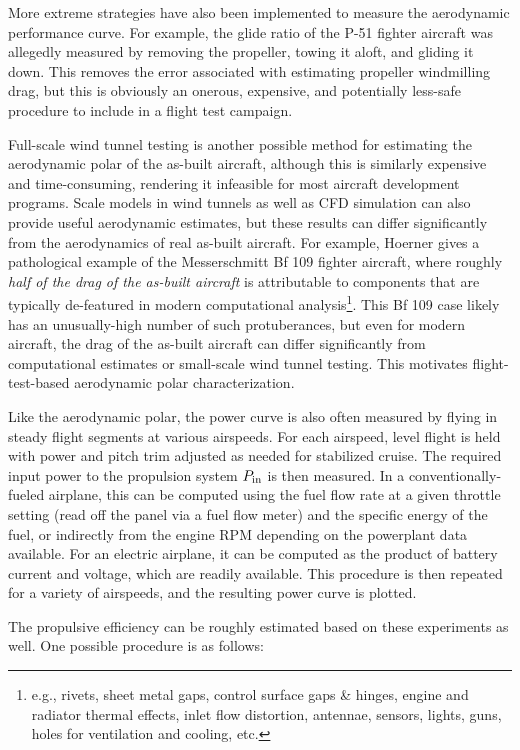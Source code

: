 More extreme strategies have also been implemented to measure the aerodynamic performance curve. For example, the glide ratio of the P-51 fighter aircraft was allegedly measured by removing the propeller, towing it aloft, and gliding it down. This removes the error associated with estimating propeller windmilling drag, but this is obviously an onerous, expensive, and potentially less-safe procedure to include in a flight test campaign.

Full-scale wind tunnel testing is another possible method for estimating the aerodynamic polar of the as-built aircraft, although this is similarly expensive and time-consuming, rendering it infeasible for most aircraft development programs. Scale models in wind tunnels as well as CFD simulation can also provide useful aerodynamic estimates, but these results can differ significantly from the aerodynamics of real as-built aircraft. For example, Hoerner \cite{hoerner_fluiddynamic_1965} gives a pathological example of the Messerschmitt Bf 109 fighter aircraft, where roughly \emph{half of the drag of the as-built aircraft} is attributable to components that are typically de-featured in modern computational analysis\footnote{e.g., rivets, sheet metal gaps, control surface gaps \& hinges, engine and radiator thermal effects, inlet flow distortion, antennae, sensors, lights, guns, holes for ventilation and cooling, etc.}. This Bf 109 case likely has an unusually-high number of such protuberances, but even for modern aircraft, the drag of the as-built aircraft can differ significantly from computational estimates or small-scale wind tunnel testing. This motivates flight-test-based aerodynamic polar characterization.

Like the aerodynamic polar, the power curve is also often measured by flying in steady flight segments at various airspeeds. For each airspeed, level flight is held with power and pitch trim adjusted as needed for stabilized cruise. The required input power to the propulsion system $P_{\rm in}$ is then measured. In a conventionally-fueled airplane, this can be computed using the fuel flow rate at a given throttle setting (read off the panel via a fuel flow meter) and the specific energy of the fuel, or indirectly from the engine RPM depending on the powerplant data available. For an electric airplane, it can be computed as the product of battery current and voltage, which are readily available. This procedure is then repeated for a variety of airspeeds, and the resulting power curve is plotted.

The propulsive efficiency can be roughly estimated based on these experiments as well. One possible procedure is as follows:

